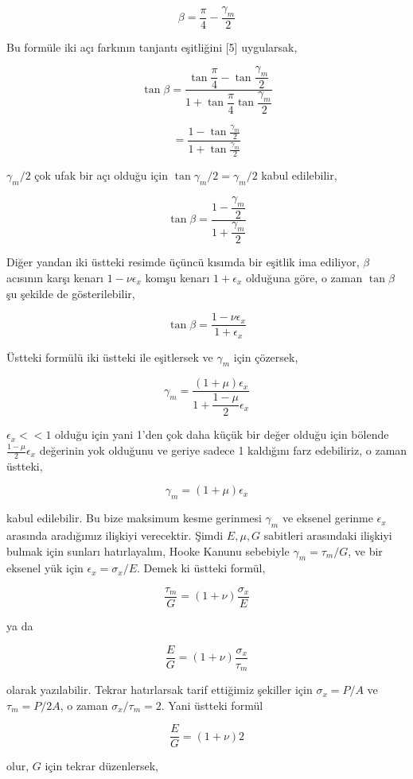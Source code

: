 \documentclass[12pt,fleqn]{article}\usepackage{../../common}
\begin{document}
$$
\beta = \frac{\pi}{4} - \frac{\gamma_m}{2}
$$

Bu formüle iki açı farkının tanjantı eşitliğini [5] uygularsak,

$$
\tan \beta =
\dfrac{\tan \dfrac{\pi}{4} - \tan \dfrac{\gamma_m}{2}}
      {1 + \tan \dfrac{\pi}{4} \tan \dfrac{\gamma_m}{2}}
$$

$$
= \frac{1 - \tan \frac{\gamma_m}{2}}{1 + \tan \frac{\gamma_m}{2} }
$$

$\gamma_m / 2$ çok ufak bir açı olduğu için $\tan \gamma_m / 2 = \gamma_m / 2$
kabul edilebilir,

$$
\tan \beta = \dfrac{1 - \dfrac{\gamma_m}{2}}{1 + \dfrac{\gamma_m}{2}}
$$

Diğer yandan iki üstteki resimde üçüncü kısımda bir eşitlik ima ediliyor,
$\beta$ acısının karşı kenarı $1 - \nu \epsilon_x$ komşu kenarı $1 +
\epsilon_x$ olduğuna göre, o zaman $\tan\beta$ şu şekilde de gösterilebilir,

$$
\tan\beta = \frac{1 - \nu \epsilon_x}{1 + \epsilon_x}
$$

Üstteki formülü iki üstteki ile eşitlersek ve $\gamma_m$ için çözersek,

$$
\gamma_m = \dfrac{(1+\mu)\epsilon_x}{ 1 + \dfrac{1-\mu}{2} \epsilon_x}
$$

$\epsilon_x << 1$ olduğu için yani 1'den çok daha küçük bir değer olduğu için
bölende $\frac{1-\mu}{2} \epsilon_x$ değerinin yok olduğunu ve geriye
sadece 1 kaldığını farz edebiliriz, o zaman üstteki,

$$
\gamma_m = (1+\mu) \epsilon_x
$$

kabul edilebilir. Bu bize maksimum kesme gerinmesi $\gamma_m$ ve eksenel gerinme
$\epsilon_x$ arasında aradığımız ilişkiyi verecektir. Şimdi $E,\mu,G$ sabitleri
arasındaki ilişkiyi bulmak için sunları hatırlayalım, Hooke Kanunu sebebiyle
$\gamma_m = \tau_m / G$, ve bir eksenel yük için $\epsilon_x = \sigma_x /
E$. Demek ki üstteki formül,

$$
\frac{\tau_m}{G} = (1+\nu) \frac{\sigma_x}{E}
$$

ya da

$$
\frac{E}{G} = (1+\nu) \frac{\sigma_x}{\tau_m}
$$

olarak yazılabilir. Tekrar hatırlarsak tarif ettiğimiz şekiller için
$\sigma_x = P / A$ ve $\tau_m = P / 2A$, o zaman $\sigma_x / \tau_m = 2$.
Yani üstteki formül

$$
\frac{E}{G} = (1+\nu) 2
$$

olur, $G$ için tekrar düzenlersek,
\end{document}

